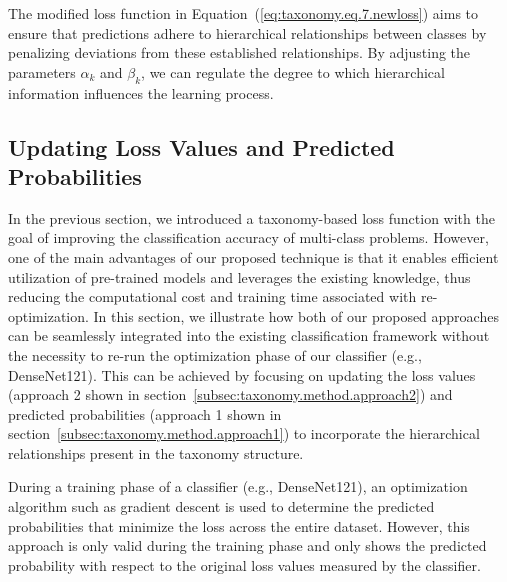 The modified loss function in Equation~(\ref{eq:taxonomy.eq.7.newloss})  aims to ensure that predictions adhere to hierarchical relationships between classes by penalizing deviations from these established relationships. By adjusting the parameters $\alpha_k $ and $\beta_k $, we can regulate the degree to which hierarchical information influences the learning process.

\subsection{Updating Loss Values and Predicted Probabilities}\label{subsec:updating-loss-values-and-predicted-probabilities}

In the previous section, we introduced a taxonomy-based loss function with the goal of improving the classification accuracy of multi-class problems. However, one of the main advantages of our proposed technique is that it enables efficient utilization of pre-trained models and leverages the existing knowledge, thus reducing the computational cost and training time associated with re-optimization. In this section, we illustrate how both of our proposed approaches can be seamlessly integrated into the existing classification framework without the necessity to re-run the optimization phase of our classifier (e.g., DenseNet121). This can be achieved by focusing on updating the loss values (approach 2 shown in section~\ref{subsec:taxonomy.method.approach2}) and predicted probabilities (approach 1 shown in section~\ref{subsec:taxonomy.method.approach1}) to incorporate the hierarchical relationships present in the taxonomy structure. 

During a training phase of a classifier (e.g., DenseNet121), an optimization algorithm such as gradient descent is used to determine the predicted probabilities that minimize the loss across the entire dataset. However, this approach is only valid during the training phase and only shows the predicted probability with respect to the original loss values measured by the classifier.

